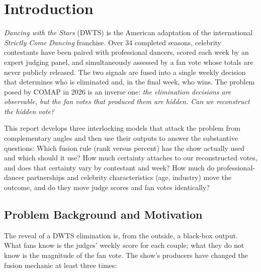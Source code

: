 \documentclass{article}
\begin{document}
\newpage

\tableofcontents
\newpage

\section{Introduction}

\emph{Dancing with the Stars} (DWTS) is the American adaptation of the international
\emph{Strictly Come Dancing} franchise. Over 34 completed seasons, celebrity contestants
have been paired with professional dancers, scored each week by an expert judging panel,
and simultaneously assessed by a fan vote whose totals are never publicly released. The
two signals are fused into a single weekly decision that determines who is eliminated
and, in the final week, who wins. The problem posed by COMAP in 2026 is an inverse one:
\emph{the elimination decisions are observable, but the fan votes that produced them are
hidden. Can we reconstruct the hidden vote?}

This report develops three interlocking models that attack the problem from complementary
angles and then use their outputs to answer the substantive questions: Which fusion rule
(rank versus percent) has the show actually used and which should it use? How much
certainty attaches to our reconstructed votes, and does that certainty vary by contestant
and week? How much do professional-dancer partnerships and celebrity characteristics
(age, industry) move the outcome, and do they move judge scores and fan votes identically?

\subsection{Problem Background and Motivation}

The reveal of a DWTS elimination is, from the outside, a black-box output. What fans know
is the judges' weekly score for each couple; what they do not know is the magnitude of the
fan vote. The show's producers have changed the fusion mechanic at least three times:
\end{document}
